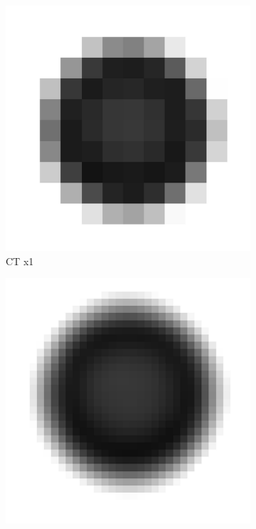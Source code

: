 \documentclass[parskip,bibtotoc,final,twoside=false,titlepage,a4paper,english,12pt,titlepage,a4paper]{scrbook}
\begin{document}
\begin{figure}[!thb]
  \begin{subfigure}[b]{0.32\textwidth}
    \includegraphics[scale=.11]{slicer3D/profiles/CT_x1.png}
    \caption{CT x1}
    \label{fig:CT_x1}
  \end{subfigure}
  \hfill
  \begin{subfigure}[b]{0.32\textwidth}
    \includegraphics[scale=.11]{slicer3D/profiles/CT_x9.png}

\end{subfigure}
\end{figure}
\end{document}
